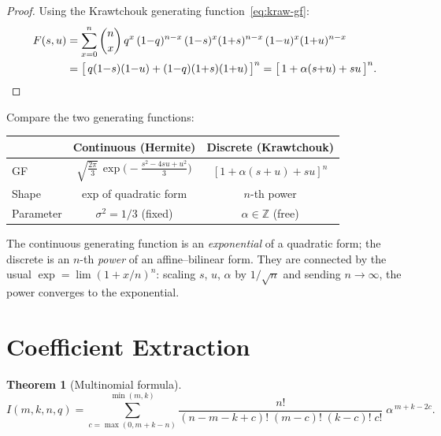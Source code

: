 \documentclass[11pt,a4paper]{article}
\theoremstyle{plain}
\newtheorem{theorem}{Theorem}[section]
\theoremstyle{definition}
\newcommand{\Z}{\mathbb{Z}}
\begin{document}
\begin{proof}
Using the Krawtchouk generating function~\eqref{eq:kraw-gf}:
\begin{align*}
  F(s,u)
  &= \sum_{x=0}^{n} \binom{n}{x}\, q^x\, (1{-}q)^{n-x}\,
     (1{-}s)^x(1{+}s)^{n-x}\, (1{-}u)^x(1{+}u)^{n-x} \\
  &= \bigl[\, q(1{-}s)(1{-}u) + (1{-}q)(1{+}s)(1{+}u) \,\bigr]^n
  = \bigl[\, 1 + \alpha(s{+}u) + su \,\bigr]^n.
  \qedhere
\end{align*}
\end{proof}

\begin{tcolorbox}[breakable, colback=yellow!10, colframe=yellow!10,
  boxrule=0pt, sharp corners]
Compare the two generating functions:

\medskip
\begin{center}
\renewcommand{\arraystretch}{1.5}
\begin{tabular}{lcc}
  \toprule
  & Continuous (Hermite) & Discrete (Krawtchouk) \\
  \midrule
  GF & $\sqrt{\tfrac{2\pi}{3}}\,
    \exp\!\bigl(-\frac{s^2 - 4su + u^2}{3}\bigr)$
     & $[1 + \alpha(s{+}u) + su]^n$ \\[6pt]
  Shape & exp of quadratic form & $n$-th power \\
  Parameter & $\sigma^2 = 1/3$ (fixed) & $\alpha \in \Z$ (free) \\
  \bottomrule
\end{tabular}
\end{center}

\medskip
The continuous generating function is an \emph{exponential} of a
quadratic form; the discrete is an $n$-th \emph{power} of an
affine--bilinear form. They are connected by the usual
$\exp = \lim (1 + x/n)^n$: scaling $s$, $u$, $\alpha$ by
$1/\sqrt{n}$ and sending $n \to \infty$, the power converges to the
exponential.
\end{tcolorbox}

\section{Coefficient Extraction}

\begin{tcolorbox}[colback=black!5, colframe=black!5, boxrule=0pt,
  sharp corners]
\begin{theorem}[Multinomial formula]\label{thm:kraw-coeff}
\begin{equation}\label{eq:kraw-coeff}
  I(m, k, n, q)
  = \sum_{c=\max(0,m+k-n)}^{\min(m,k)}
  \frac{n!}{(n{-}m{-}k{+}c)!\;(m{-}c)!\;(k{-}c)!\;c!}
  \;\alpha^{\,m+k-2c}.
\end{equation}
\end{theorem}
\end{tcolorbox}
\end{document}
